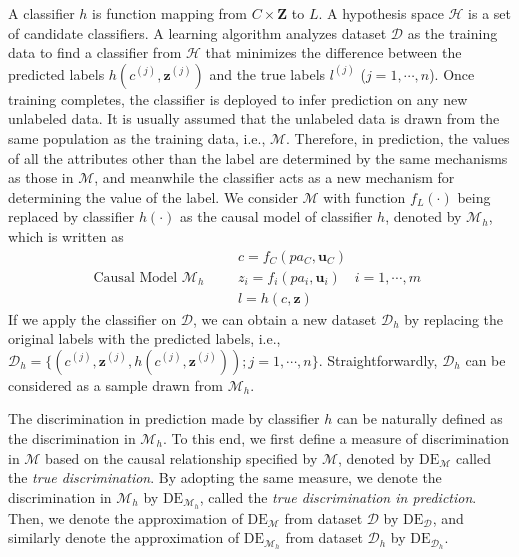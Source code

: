 \documentclass{article}
\begin{document}
A classifier $h$ is function mapping from $C\times \mathbf{Z}$ to $L$. A hypothesis space $\mathcal{H}$ is a set of candidate classifiers. A learning algorithm analyzes dataset $\mathcal{D}$ as the training data to find a classifier from $\mathcal{H}$ that minimizes the difference between the predicted labels $h(c^{(j)},\mathbf{z}^{(j)})$ and the true labels $l^{(j)}$ ($j=1,\cdots,n$). Once training completes, the classifier is deployed to infer prediction on any new unlabeled data. %
It is usually assumed that the unlabeled data is drawn from the same population as the training data, i.e., $\mathcal{M}$. Therefore, in prediction, the values of all the attributes other than the label are determined by the same mechanisms as those in $\mathcal{M}$, and meanwhile the classifier acts as a new mechanism for determining the value of the label. We consider $\mathcal{M}$ with function $f_{L}(\cdot)$ being replaced by classifier $h(\cdot)$ as the causal model of classifier $h$, denoted by $\mathcal{M}_{h}$, which is written as
\begin{equation*}
\textrm{Causal Model $\mathcal{M}_{h}$} \quad\quad
\begin{array}{l}
c = f_{C}(pa_{C},\mathbf{u}_{C}) \\
z_{i} = f_{i}(pa_{i},\mathbf{u}_{i}) \quad i=1,\cdots,m \\
l = h(c,\mathbf{z})
\end{array}
\end{equation*}
If we apply the classifier on $\mathcal{D}$, we can obtain a new dataset $\mathcal{D}_{h}$ by replacing the original labels with the predicted labels, i.e., $\mathcal{D}_{h}=\{(c^{(j)},\mathbf{z}^{(j)}, h(c^{(j)},\mathbf{z}^{(j)}));j=1,\cdots,n\}$. Straightforwardly, $\mathcal{D}_{h}$ can be considered as a sample drawn from $\mathcal{M}_{h}$.

The discrimination in prediction made by classifier $h$ can be naturally defined as the discrimination in $\mathcal{M}_{h}$. To this end, we first define a measure of discrimination in $\mathcal{M}$ based on the causal relationship specified by $\mathcal{M}$, denoted by $\mathrm{DE}_{\mathcal{M}}$ called the \emph{true discrimination}. By adopting the same measure, we denote the discrimination in $\mathcal{M}_{h}$ by $\mathrm{DE}_{\mathcal{M}_{h}}$, called the \emph{true discrimination in prediction}. Then, we denote the approximation of $\mathrm{DE}_{\mathcal{M}}$ from dataset $\mathcal{D}$ by $\mathrm{DE}_{\mathcal{D}}$, and similarly denote the approximation of $\mathrm{DE}_{\mathcal{M}_{h}}$ from dataset $\mathcal{D}_{h}$ by $\mathrm{DE}_{\mathcal{D}_{h}}$.
\end{document}
